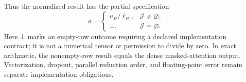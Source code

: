Thus the normalized result has the partial specification
\begin{equation}
\label{eq:C04:streaming-output}
 o=\begin{cases}
 u_R/\ell_R,&\mathcal J\ne\varnothing,\\
 \bot,&\mathcal J=\varnothing.
 \end{cases}
\end{equation}
Here $\bot$ marks an empty-row outcome requiring a declared implementation contract; it is not a numerical tensor or permission to divide by zero. In exact arithmetic, the nonempty-row result equals the dense masked-attention output. Vectorization, dropout, parallel reduction order, and floating-point error remain separate implementation obligations.

